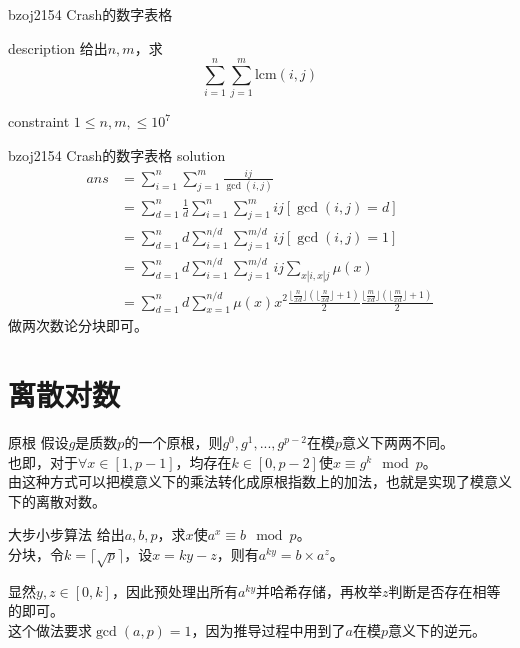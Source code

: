 \documentclass{beamer}
\begin{document}
\begin{frame}{bzoj2154 Crash的数字表格}
	\begin{block}{description}
		给出$n, m$，求$$\sum_{i=1}^n\sum_{j=1}^m\mathrm{lcm}(i,j)$$
	\end{block}
	\begin{block}{constraint}
		$1 \le n, m, \le 10^7$
	\end{block}
\end{frame}
\begin{frame}{bzoj2154 Crash的数字表格 solution}
		\begin{align*}
		ans &= \sum_{i=1}^n\sum_{j=1}^m\frac{ij}{\gcd(i,j)}\\
		&= \sum_{d=1}^{n}\frac{1}{d}\sum_{i=1}^n\sum_{j=1}^mij[\gcd(i,j)=d]\\
		&= \sum_{d=1}^{n}d\sum_{i=1}^{n/d}\sum_{j=1}^{m/d}ij[\gcd(i,j)=1]\\
		&= \sum_{d=1}^{n}d\sum_{i=1}^{n/d}\sum_{j=1}^{m/d}ij\sum_{x|i, x|j}\mu(x)\\
		&= \sum_{d=1}^{n}d\sum_{x=1}^{n/d}\mu(x)x^2\frac {\lfloor\frac n{xd}\rfloor(\lfloor\frac n{xd}\rfloor+1)}{2} \frac {\lfloor\frac m{xd}\rfloor(\lfloor\frac m{xd}\rfloor+1)}{2}
		\end{align*}
	做两次数论分块即可。
\end{frame}
\section{离散对数}
\begin{frame}{原根}
	假设$g$是质数$p$的一个原根，则$g^0,g^1,...,g^{p-2}$在模$p$意义下两两不同。
	\\
	
	也即，对于$\forall x\in[1,p-1]$，均存在$k\in[0,p-2]$使$x \equiv g^k \mod p$。
	\\
	
	由这种方式可以把模意义下的乘法转化成原根指数上的加法，也就是实现了模意义下的离散对数。
	
\end{frame}
\begin{frame}{大步小步算法}
	给出$a,b,p$，求$x$使$a^x \equiv b \mod p$。
	\pause\\
	
	分块，令$k=\lceil\sqrt p\rceil$，设$x=ky-z$，则有$a^{ky}=b\times a^z$。
	
	显然$y,z \in [0,k]$，因此预处理出所有$a^{ky}$并哈希存储，再枚举$z$判断是否存在相等的即可。
	\pause\\
	
	这个做法要求$\gcd(a,p)=1$，因为推导过程中用到了$a$在模$p$意义下的逆元。
\end{frame}
\end{document}
